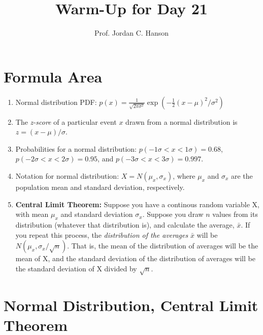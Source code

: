 \documentclass{article}
\begin{document}
\title{Warm-Up for Day 21}
\author{Prof. Jordan C. Hanson}

\maketitle

\section{Formula Area}

\begin{enumerate}
\item Normal distribution PDF: $p(x) = \frac{1}{\sqrt{2\pi \sigma^2}} \exp\left( -\frac{1}{2}(x-\mu)^2/\sigma^2 \right)$
\item The \textit{z-score} of a particular event $x$ drawn from a normal distribution is $z = (x-\mu)/\sigma$.
\item Probabilities for a normal distribution: $p(-1\sigma < x < 1\sigma) = 0.68$, $p(-2\sigma < x < 2\sigma) = 0.95$, and $p(-3\sigma < x < 3\sigma) = 0.997$.
\item Notation for normal distribution: $X = N(\mu_x,\sigma_x)$, where $\mu_x$ and $\sigma_x$ are the population mean and standard deviation, respectively.
\item \textbf{Central Limit Theorem:} Suppose you have a continous random variable X, with mean $\mu_x$ and standard deviation $\sigma_x$.  Suppose you draw $n$ values from its distribution (whatever that distribution is), and calculate the average, $\bar{x}$.  If you repeat this process, the \textit{distribution of the averages} $\bar{x}$ will be $N(\mu_x,\sigma_x/\sqrt{n})$.  That is, the mean of the distribution of averages will be the mean of X, and the standard deviation of the distribution of averages will be the standard deviation of X divided by $\sqrt{n}$.
\end{enumerate}

\section{Normal Distribution, Central Limit Theorem}
\end{document}
